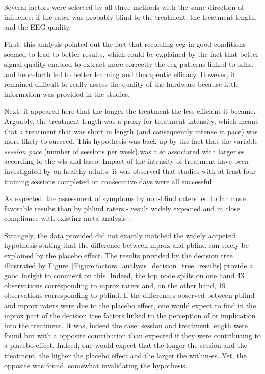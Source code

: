Several factors were selected by all three methods with the same direction of influence: if the rater was
probably blind to the treatment, the treatment length, and the EEG quality. 

First, this analysis pointed out the fact that recording \gls{eeg} in good conditions seemed to lead to better results,
which could be explained by the fact that better signal quality enabled to extract more correctly the \gls{eeg} patterns
linked to \gls{adhd} and henceforth led to better learning and therapeutic efficacy. However, it remained difficult to
really assess the quality of the hardware because little information was provided in the studies.  

Next, it appeared here that the longer the treatment the less efficient it became. Arguably, the treatment length was a
proxy for treatment intensity, which meant that a treatment that was short in length (and consequently intense in pace)
was more likely to succeed. This hypothesis was back-up by the fact that the variable \emph{session pace} (number of
sessions per week) was also associated with larger \gls{es} according to the \gls{wls} and \gls{lasso}. Impact of the
intensity of treatment have been investigated by \citep{Rogala2016} on healthy adults: it was observed that studies with
at least four training sessions completed on consecutive days were all successful. 

As expected, the assessment of symptoms by non-blind raters led to far more favorable results than by \gls{pblind} raters -
result widely expected and in close compliance with existing meta-analysis \citep{Cortese2016, Micoulaud2014}. 

Strangely, the data provided did not exactly matched the widely accpeted hypothesis stating that the difference between
\gls{mprox} and \gls{pblind} can solely be explained by the placebo effect. The results provided by the decision tree
illustrated by Figure~\ref{Figure:factors_analysis_decision_tree_results} provide a good insight to comment on this.
Indeed, the top node splits on one hand 43 observations corresponding to \gls{mprox} raters and, on the other hand, 19 observations corresponding to \gls{pblind}. If the differences observed between \gls{pblind} and \gls{mprox} raters were due to the
placebo effect, one would expect to find in the \gls{mprox} part of the decision tree factors linked to the perception
of or implication into the treatment. It was, indeed the case: session and treatment length were found but with a
opposite contribution than expected if they were contributing to a placebo effect.  Indeed, one would expect that the
longer the session and the treatment, the higher the placebo effect and the larger the within-\gls{es}.
Yet, the opposite was found, somewhat invalidating the hypothesis. 

